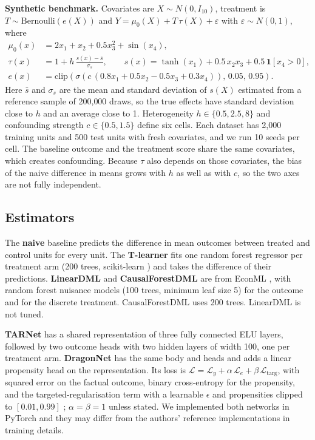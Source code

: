 \documentclass[10pt]{article}
\begin{document}
\textbf{Synthetic benchmark.} Covariates are $X\sim N(0,I_{10})$, treatment is $T\sim\mathrm{Bernoulli}(e(X))$ and $Y=\mu_0(X)+T\,\tau(X)+\varepsilon$ with $\varepsilon\sim N(0,1)$, where
\begin{align}
\mu_0(x) &= 2x_1 + x_2 + 0.5x_3^2 + \sin(x_4),\\
\tau(x) &= 1 + h\,\frac{s(x)-\bar s}{\sigma_s}, \qquad s(x)=\tanh(x_1)+0.5\,x_2x_3+0.5\,\mathbf{1}[x_4>0],\\
e(x) &= \mathrm{clip}\!\left(\sigma\!\left(c\,(0.8x_1+0.5x_2-0.5x_3+0.3x_4)\right),\,0.05,\,0.95\right).
\end{align}
Here $\bar s$ and $\sigma_s$ are the mean and standard deviation of $s(X)$ estimated from a reference sample of 200{,}000 draws, so the true effects have standard deviation close to $h$ and an average close to 1. Heterogeneity $h\in\{0.5,2.5,8\}$ and confounding strength $c\in\{0.5,1.5\}$ define six cells. Each dataset has 2{,}000 training units and 500 test units with fresh covariates, and we run 10 seeds per cell. The baseline outcome and the treatment score share the same covariates, which creates confounding. Because $\tau$ also depends on those covariates, the bias of the naive difference in means grows with $h$ as well as with $c$, so the two axes are not fully independent.

\subsection{Estimators}

The \textbf{naive} baseline predicts the difference in mean outcomes between treated and control units for every unit. The \textbf{T-learner} fits one random forest regressor per treatment arm (200 trees, scikit-learn \citep{pedregosa2011scikit}) and takes the difference of their predictions. \textbf{LinearDML} and \textbf{CausalForestDML} are from EconML \citep{battocchi2019econml}, with random forest nuisance models (100 trees, minimum leaf size 5) for the outcome and for the discrete treatment. CausalForestDML uses 200 trees. LinearDML is not tuned.

\textbf{TARNet} has a shared representation of three fully connected ELU layers, followed by two outcome heads with two hidden layers of width 100, one per treatment arm. \textbf{DragonNet} has the same body and heads and adds a linear propensity head on the representation. Its loss is $\mathcal{L}=\mathcal{L}_{y}+\alpha\,\mathcal{L}_{e}+\beta\,\mathcal{L}_{\mathrm{targ}}$, with squared error on the factual outcome, binary cross-entropy for the propensity, and the targeted-regularisation term with a learnable $\epsilon$ and propensities clipped to $[0.01,0.99]$ \citep{shi2019adapting}; $\alpha=\beta=1$ unless stated. We implemented both networks in PyTorch \citep{paszke2019pytorch} and they may differ from the authors' reference implementations in training details.
\end{document}
